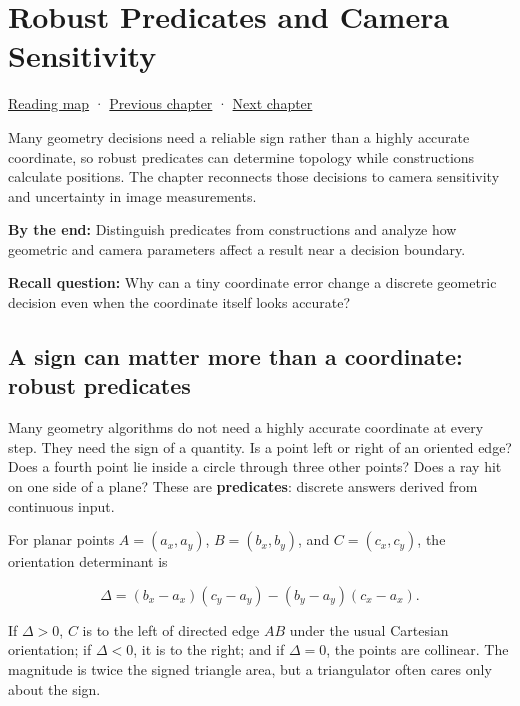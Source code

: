 \hypertarget{02-foundations-ii-ch034}{}
\chapter{Robust Predicates and Camera Sensitivity}\label{stagechapter:02-foundations-ii-ch034}\label{02-foundations-ii-ch034-robust-predicates-and-camera-sensitivity}

\hyperref[volume-reading-map]{Reading map} · \hyperref[02-foundations-ii-ch033-projection-clipping-and-raster-sampling]{Previous chapter} · \hyperref[02-foundations-ii-ch035-camera-extrinsics-and-projection-geometry]{Next chapter}

Many geometry decisions need a reliable sign rather than a highly accurate coordinate, so robust predicates can determine topology while constructions calculate positions. The chapter reconnects those decisions to camera sensitivity and uncertainty in image measurements.

\textbf{By the end:} Distinguish predicates from constructions and analyze how geometric and camera parameters affect a result near a decision boundary.

\textbf{Recall question:} Why can a tiny coordinate error change a discrete geometric decision even when the coordinate itself looks accurate?

\section{A sign can matter more than a coordinate: robust predicates}\label{02-foundations-ii-ch034-a-sign-can-matter-more-than-a-coordinate-robust-predicates}

Many geometry algorithms do not need a highly accurate coordinate at every step. They need the sign of a quantity. Is a point left or right of an oriented edge? Does a fourth point lie inside a circle through three other points? Does a ray hit on one side of a plane? These are \textbf{predicates}: discrete answers derived from continuous input.

For planar points \(A=(a_x,a_y)\), \(B=(b_x,b_y)\), and \(C=(c_x,c_y)\), the orientation determinant is

\[
\Delta = (b_x-a_x)(c_y-a_y)-(b_y-a_y)(c_x-a_x).
\]

If \(\Delta>0\), \(C\) is to the left of directed edge \(AB\) under the usual Cartesian orientation; if \(\Delta<0\), it is to the right; and if \(\Delta=0\), the points are collinear. The magnitude is twice the signed triangle area, but a triangulator often cares only about the sign.

